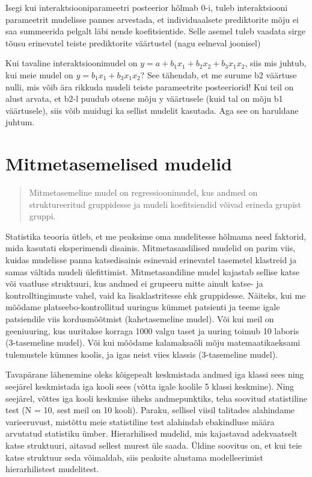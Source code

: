 \documentclass[]{book}
\begin{document}
Isegi kui interaktsiooniparameetri posteerior hõlmab 0-i, tuleb
interaktsiooni parameetrit mudelisse pannes arvestada, et
individuaalsete prediktorite mõju ei saa summeerida pelgalt läbi nende
koefitsientide. Selle asemel tuleb vaadata sirge tõusu erinevatel teiste
prediktorite väärtustel (nagu eelneval joonisel)

Kui tavaline interaktsioonimudel on
\(y = a + b_1x_1 + b_2x_2 + b_3x_1x_2\), siis mis juhtub, kui meie mudel
on \(y = b_1x_1 + b_3x_1x_2\)? See tähendab, et me surume b2 väärtuse
nulli, mis võib ära rikkuda mudeli teiste parameetrite posteeriorid! Kui
teil on alust arvata, et b2-l puudub otsene mõju y väärtusele (kuid tal
on mõju b1 väärtusele), siis võib muidugi ka sellist mudelit kasutada.
Aga see on haruldane juhtum.

\chapter{Mitmetasemelised mudelid}\label{mitmetasemelised-mudelid}

\begin{quote}
Mitmetasemeline mudel on regressioonimudel, kus andmed on
struktureeritud gruppidesse ja mudeli koefitsiendid võivad erineda
grupist gruppi.
\end{quote}

Statistika teooria ütleb, et me peaksime oma mudelitesse hõlmama need
faktorid, mida kasutati eksperimendi disainis. Mitmetasandilised mudelid
on parim viis, kuidas mudelisse panna katsedisainis esinevaid erinevatel
tasemetel klastreid ja samas vältida mudeli ülefittimist.
Mitmetasandiline mudel kajastab sellise katse või vaatluse struktuuri,
kus andmed ei grupeeru mitte ainult katse- ja kontrolltingimuste vahel,
vaid ka lisaklastritesse ehk gruppidesse. Näiteks, kui me mõõdame
platseebo-kontrollitud uuringus kümmet patsienti ja teeme igale
patsiendile viis kordusmõõtmist (kahetasemeline mudel). Või kui meil on
geeniuuring, kus uuritakse korraga 1000 valgu taset ja uuring toimub 10
laboris (3-tasemeline mudel). Või kui mõõdame kalamaksaõli mõju
matemaatikaeksami tulemustele kümnes koolis, ja igas neist viies klassis
(3-tasemeline mudel).

Tavapärane lähenemine oleks kõigepealt keskmistada andmed iga klassi
sees ning seejärel keskmistada iga kooli sees (võtta igale koolile 5
klassi keskmine). Ning seejärel, võttes iga kooli keskmise üheks
andmepunktiks, teha soovitud statistiline test (N = 10, sest meil on 10
kooli). Paraku, sellisel viisil talitades alahindame varieeruvust,
mistõttu meie statistiline test alahindab ebakindluse määra arvutatud
statistiku ümber. Hierarhilised mudelid, mis kajastavad adekvaatselt
katse struktuuri, aitavad sellest murest üle saada. Üldine soovitus on,
et kui teie katse struktuur seda võimaldab, siis peaksite alustama
modelleerimist hierarhilistest mudelitest.
\end{document}
